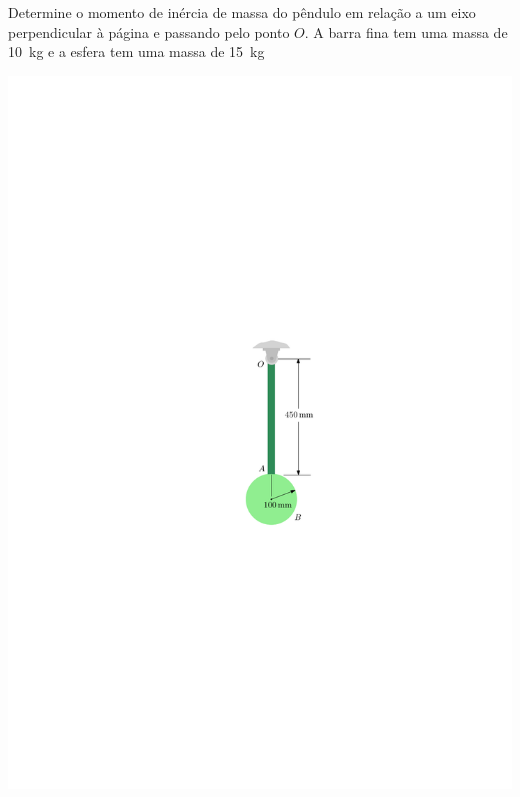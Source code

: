 \item Determine o momento de inércia de massa do pêndulo em relação a um eixo perpendicular à página e passando pelo ponto $O$. A barra fina tem uma massa de \SI{10}{\kilogram} e a esfera tem uma massa de \SI{15}{\kilogram}

\vspace{-.7cm}
\begin{flushright}
	\includegraphics[scale=1.1]{../../images/draw_4_1} 
\end{flushright}